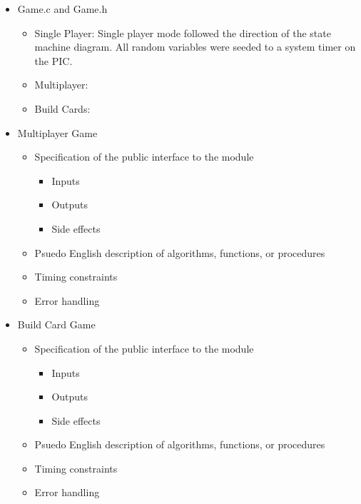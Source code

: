 \documentclass[12pt]{article} %
\begin{document}
\begin{itemize}
	
\begin{itemize}
	\item Game.c and Game.h
		\begin{itemize}
			\item Single Player: Single player mode followed the direction of the state machine diagram. All random variables were seeded to a system timer on the PIC.
			\item Multiplayer:
			\item Build Cards: 
		\end{itemize}
\end{itemize}

\begin{itemize}
	\item Multiplayer Game
		\begin{itemize}
			\item Specification of the public interface to the module

				\begin{itemize}
					\item Inputs
					\item Outputs
					\item Side effects
				\end{itemize}

			\item Psuedo English description of algorithms, functions, or procedures
			\item Timing constraints
			\item Error handling
		\end{itemize}
\end{itemize}

\begin{itemize}
	\item Build Card Game

		\begin{itemize}
			\item Specification of the public interface to the module

				\begin{itemize}
					\item Inputs
					\item Outputs
					\item Side effects
				\end{itemize}

			\item Psuedo English description of algorithms, functions, or procedures
			\item Timing constraints
			\item Error handling
		\end{itemize}
\end{itemize}


\end{itemize}
\end{document}
